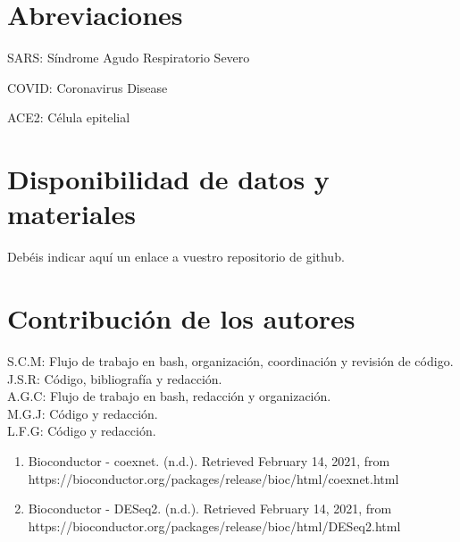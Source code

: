 \documentclass{bmcart}
\begin{document}
	\begin{backmatter}
	
		\section*{Abreviaciones}%
			SARS: Síndrome Agudo Respiratorio Severo
			
			COVID: Coronavirus Disease
			
			ACE2: Célula epitelial
		
		\section*{Disponibilidad de datos y materiales}%
			Debéis indicar aquí un enlace a vuestro repositorio de github.
		
		\section*{Contribución de los autores}
			S.C.M: Flujo de trabajo en bash, organización, coordinación y revisión de código.\\
			J.S.R: Código, bibliografía y redacción.\\
			A.G.C: Flujo de trabajo en bash, redacción y organización.\\
			M.G.J: Código y redacción.\\
			L.F.G: Código y redacción.\\
		
		
		
		
		\begin{enumerate}
		
			\item Bioconductor - coexnet. (n.d.). Retrieved February 14, 2021, from https://bioconductor.org/packages/release/bioc/html/coexnet.html
			
			\item Bioconductor - DESeq2. (n.d.). Retrieved February 14, 2021, from https://bioconductor.org/packages/release/bioc/html/DESeq2.html
			

\end{enumerate}
\end{backmatter}
\end{document}
